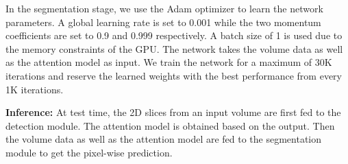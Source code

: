 In the segmentation stage, we use the Adam optimizer \cite{kingma2014adam} to learn the network parameters. A global learning rate is set to 0.001 while the two momentum coefficients are set to 0.9 and 0.999 respectively. A batch size of 1 is used due to the memory constraints of the GPU. The network takes the volume data as well as the attention model as input. We train the network for a maximum of 30K iterations and reserve the learned weights with the best performance from every 1K iterations. 
\vspace{1em}

\noindent\textbf{Inference:}
At test time, the 2D slices from an input volume are first fed to the detection module. The attention model is obtained based on the output. Then the volume data as well as the attention model are fed to the segmentation module to get the pixel-wise prediction.


